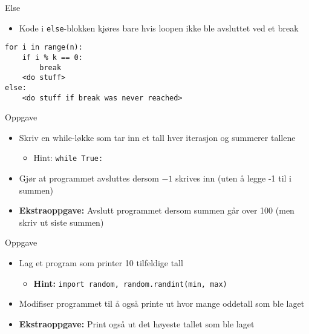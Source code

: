 \documentclass[screen, aspectratio=169]{beamer}
\begin{document}
\begin{frame}[fragile]{Else}
	\begin{itemize}
		\item Kode i \lstinline|else|-blokken kjøres bare hvis loopen ikke ble avsluttet ved et break
	\end{itemize}
	\begin{lstlisting}
for i in range(n):
	if i % k == 0:
		break
	<do stuff>
else:
	<do stuff if break was never reached>
	\end{lstlisting}
\end{frame}

\begin{frame}{Oppgave}
	\begin{itemize}
		\item<1-> Skriv en while-løkke som tar inn et tall hver iterasjon og summerer tallene
		\begin{itemize}
			\item Hint: \lstinline|while True:|
		\end{itemize}
		\item<1-> Gjør at programmet avsluttes dersom $-1$ skrives inn (uten å legge -1 til i summen)
		\item<2->\textbf{Ekstraoppgave:} Avslutt programmet dersom summen går over 100 (men skriv ut siste summen)
	\end{itemize}
\end{frame}

\begin{frame}{Oppgave}
	\begin{itemize}
		\item<1-> Lag et program som printer 10 tilfeldige tall
		\begin{itemize}
			\item \textbf{Hint:} \lstinline|import random, random.randint(min, max)|
		\end{itemize}
		\item<1-> Modifiser programmet til å også printe ut hvor mange oddetall som ble laget
		\item<2->\textbf{Ekstraoppgave:} Print også ut det høyeste tallet som ble laget
	\end{itemize}
\end{frame}

\iffalse
\begin{frame}{Oppgave}
	\begin{itemize}
		\item<+-> Lag et program som tar inn to heltall fra brukeren, max og target. Programmet skal generere tilfeldige tall mellom 0 og max helt til det lager target, og printe hvert tall.
		\item<+-> \textbf{Ekstraoppgave:} Utvid programmet til å til slutt printe ut hvor mange forsøk det trengte for å lage target
	\end{itemize}
\end{frame}
\fi
\end{document}
